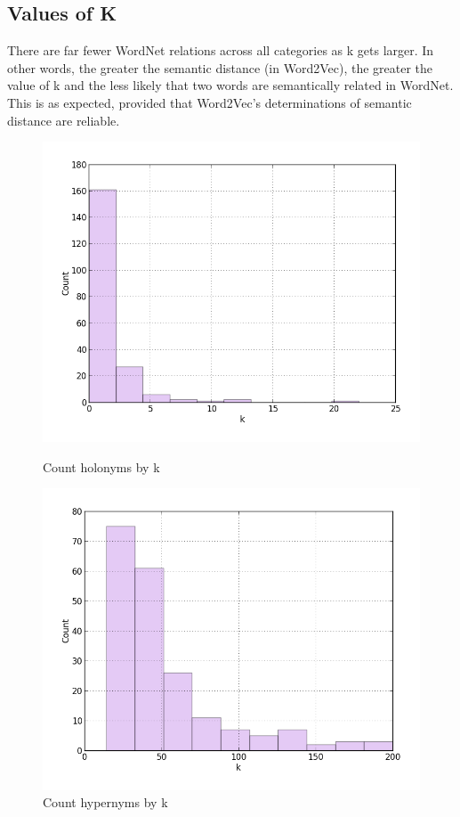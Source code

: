 \documentclass{article}
\begin{document}
\subsection{Values of K} \label{val_k}
There are far fewer WordNet relations across all categories as k gets larger.  In other words, the greater the semantic distance (in Word2Vec), the greater the value of k and the less likely that two words are semantically related in WordNet. This is as expected, provided that Word2Vec's determinations of semantic distance are reliable.

\begin{figure}    
\begin{minipage}[t]{0.45\textwidth}
\includegraphics[width=\linewidth]{Holonym_Distance.png}
\caption{Count holonyms by k}
\label{fig:holonyms}
\end{minipage}
\hspace{\fill}
\begin{minipage}[t]{0.45\textwidth}
\includegraphics[width=\linewidth]{Hypernym_Distance.png}
\caption{Count hypernyms by k}
\label{fig:hypernyms}
\end{minipage}


\end{figure}
\end{document}
